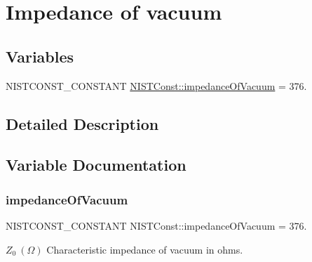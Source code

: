\hypertarget{group___n_i_s_t_const-_impedance_of_vacuum}{}\section{Impedance of vacuum}
\label{group___n_i_s_t_const-_impedance_of_vacuum}
\subsection*{Variables}
\begin{DoxyCompactItemize}
\item 
N\+I\+S\+T\+C\+O\+N\+S\+T\+\_\+\+C\+O\+N\+S\+T\+A\+NT \mbox{\hyperlink{group___n_i_s_t_const-_impedance_of_vacuum_gaed60576e7b6ccd87ca6204e09efd98ee}{N\+I\+S\+T\+Const\+::impedance\+Of\+Vacuum}} = 376.
\end{DoxyCompactItemize}


\subsection{Detailed Description}


\subsection{Variable Documentation}
\mbox{\label{group___n_i_s_t_const-_impedance_of_vacuum_gaed60576e7b6ccd87ca6204e09efd98ee}} 
\subsubsection{\texorpdfstring{impedance\+Of\+Vacuum}{impedanceOfVacuum}}
{\footnotesize\ttfamily N\+I\+S\+T\+C\+O\+N\+S\+T\+\_\+\+C\+O\+N\+S\+T\+A\+NT N\+I\+S\+T\+Const\+::impedance\+Of\+Vacuum = 376.}

$Z_0 \ (\Omega)$ Characteristic impedance of vacuum in ohms. 